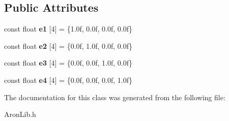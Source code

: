 \subsection*{Public Attributes}
\begin{DoxyCompactItemize}
\item 
\mbox{\label{class_space_vector4_1_1_vector4_a9bd51f001eb1a6b2435e613354351915}} 
const float {\bfseries e1} \mbox{[}4\mbox{]} = \{1.\+0f, 0.\+0f, 0.\+0f, 0.\+0f\}
\item 
\mbox{\label{class_space_vector4_1_1_vector4_a7f87bb928e40319fb513f48ca5e9ee8a}} 
const float {\bfseries e2} \mbox{[}4\mbox{]} = \{0.\+0f, 1.\+0f, 0.\+0f, 0.\+0f\}
\item 
\mbox{\label{class_space_vector4_1_1_vector4_a9845a51a0e1fa4994aadde9cb2957ff3}} 
const float {\bfseries e3} \mbox{[}4\mbox{]} = \{0.\+0f, 0.\+0f, 1.\+0f, 0.\+0f\}
\item 
\mbox{\label{class_space_vector4_1_1_vector4_a1f753a69a011fbc593ec282769304ada}} 
const float {\bfseries e4} \mbox{[}4\mbox{]} = \{0.\+0f, 0.\+0f, 0.\+0f, 1.\+0f\}
\end{DoxyCompactItemize}


The documentation for this class was generated from the following file\+:\begin{DoxyCompactItemize}
\item 
Aron\+Lib.\+h\end{DoxyCompactItemize}
